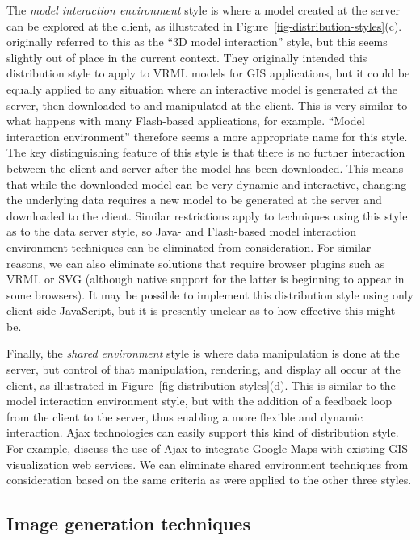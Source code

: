\documentclass[acmtocl,acmnow]{acmtrans2m}
\begin{document}
The \emph{model interaction environment} style is where a model created
at the server can be explored at the client, as illustrated in
Figure~\ref{fig-distribution-styles}(c). 
originally referred to this as the ``3D model interaction'' style, but
this seems slightly out of place in the current context. They originally
intended this distribution style to apply to VRML models for GIS
applications, but it could be equally applied to any situation where an
interactive model is generated at the server, then downloaded to and
manipulated at the client. This is very similar to what happens with
many Flash-based applications, for example. ``Model interaction
environment'' therefore seems a more appropriate name for this style.
The key distinguishing feature of this style is that there is no further
interaction between the client and server after the model has been
downloaded. This means that while the downloaded model can be very
dynamic and interactive, changing the underlying data requires a new
model to be generated at the server and downloaded to the client.
Similar restrictions apply to techniques using this style as to the
data server style, so Java- and Flash-based model interaction
environment techniques can be eliminated from consideration. For similar
reasons, we can also eliminate solutions that require browser plugins
such as VRML or SVG (although native support for the latter is beginning
to appear in some browsers). It may be possible to implement this
distribution style using only client-side JavaScript, but it is presently
unclear as to how effective this might be.


Finally, the \emph{shared environment} style is where data manipulation
is done at the server, but control of that manipulation, rendering, and
display all occur at the client, as illustrated in
Figure~\ref{fig-distribution-styles}(d). This is similar to the model
interaction environment style, but with the addition of a feedback loop
from the client to the server, thus enabling a more flexible and dynamic
interaction. Ajax technologies \cite{Garr-JJ-2005-Ajax} can easily
support this kind of distribution style. For example,
 discuss the use of Ajax to integrate Google
Maps with existing GIS visualization web services. We can eliminate
shared environment techniques from consideration based on the same
criteria as were applied to the other three styles.


\subsection{Image generation techniques}
\label{sec-image-gen}
\end{document}
